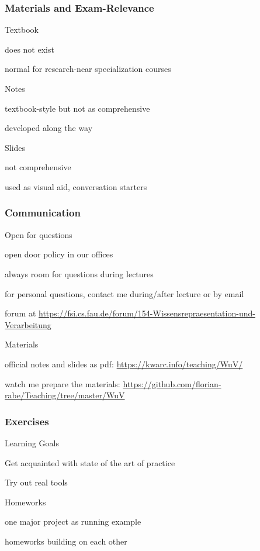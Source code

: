 \documentclass{beamer}
\begin{document}
\begin{frame}\frametitle{Materials and Exam-Relevance}
\begin{blockitems}{Textbook}
\item does not exist
\item normal for research-near specialization courses
\end{blockitems}

\begin{blockitems}{Notes}
\item textbook-style but not as comprehensive
\item developed along the way
\end{blockitems}

\begin{blockitems}{Slides}
\item not comprehensive
\item used as visual aid, conversation starters
\end{blockitems}
\end{frame}

\begin{frame}\frametitle{Communication}
\begin{blockitems}{Open for questions}
\item open door policy in our offices
\item always room for questions during lectures
\item for personal questions, contact me during/after lecture or by email
\item forum at \url{https://fsi.cs.fau.de/forum/154-Wissensrepraesentation-und-Verarbeitung}
\end{blockitems}

\begin{blockitems}{Materials}
\item official notes and slides as pdf: \url{https://kwarc.info/teaching/WuV/}
\item watch me prepare the materials: \url{https://github.com/florian-rabe/Teaching/tree/master/WuV}
\end{blockitems}
\end{frame}

\begin{frame}\frametitle{Exercises}
\begin{blockitems}{Learning Goals}
\item Get acquainted with state of the art of practice
\item Try out real tools
\end{blockitems}

\begin{blockitems}{Homeworks}
\item one major project as running example
\item homeworks building on each other
\end{blockitems}
\end{frame}
\end{document}
